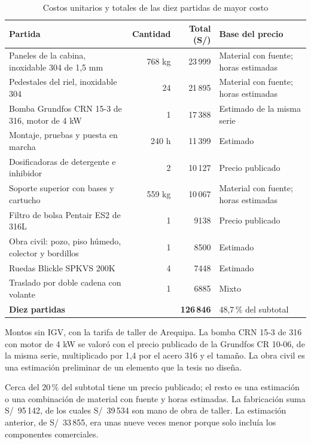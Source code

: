 \begin{table}[htbp]
\centering\small\singlespacing
\caption{Costos unitarios y totales de las diez partidas de mayor costo}
\label{tab:costos-componentes}
\begin{tabularx}{\textwidth}{@{}Yrrl@{}}
\toprule
\textbf{Partida} & \textbf{Cantidad} & \textbf{Total (S/)} & \textbf{Base del precio}\\
\midrule
Paneles de la cabina, inoxidable 304 de 1,5 mm & 768 kg & 23\,999 & Material con fuente; horas estimadas\\
Pedestales del riel, inoxidable 304 & 24 & 21\,895 & Material con fuente; horas estimadas\\
Bomba Grundfos CRN 15-3 de 316, motor de 4 kW & 1 & 17\,388 & Estimado de la misma serie\\
Montaje, pruebas y puesta en marcha & 240 h & 11\,399 & Estimado\\
Dosificadoras de detergente e inhibidor & 2 & 10\,127 & Precio publicado\\
Soporte superior con bases y cartucho & 559 kg & 10\,067 & Material con fuente; horas estimadas\\
Filtro de bolsa Pentair ES2 de 316L & 1 & 9138 & Precio publicado\\
Obra civil: pozo, piso húmedo, colector y bordillos & 1 & 8500 & Estimado\\
Ruedas Blickle SPKVS 200K & 4 & 7448 & Estimado\\
Traslado por doble cadena con volante & 1 & 6885 & Mixto\\
\midrule
\textbf{Diez partidas} & & \textbf{126\,846} & 48,7\,\% del subtotal\\
\bottomrule
\end{tabularx}
\par\smallskip\footnotesize
Montos sin IGV, con la tarifa de taller de Arequipa. La bomba CRN 15-3 de 316 con motor de 4 kW \cite{grundfoscr} se valoró con el precio publicado de la Grundfos CR 10-06, de la misma serie, multiplicado por 1,4 por el acero 316 y el tamaño. La obra civil es una estimación preliminar de un elemento que la tesis no diseña.
\end{table}

Cerca del 20\,\% del subtotal tiene un precio publicado; el resto es una estimación o una combinación de material con fuente y horas estimadas. La fabricación suma S/~95\,142, de los cuales S/~39\,534 son mano de obra de taller. La estimación anterior, de S/~33\,855, era unas nueve veces menor porque solo incluía los componentes comerciales.

